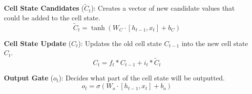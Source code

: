 \documentclass[12pt]{article}
\begin{document}
\textbf{Cell State Candidates} (\(\tilde{C}_t\)): Creates a vector of new candidate values that could be added to the cell state.
\begin{equation}
    \tilde{C}_t = \tanh(W_C \cdot [h_{t-1}, x_t] + b_C)
\end{equation}

\textbf{Cell State Update} (\(C_t\)): Updates the old cell state \(C_{t-1}\) into the new cell state \(C_t\).
\begin{equation}
    C_t = f_t \ast C_{t-1} + i_t \ast \tilde{C}_t
\end{equation}

\textbf{Output Gate} (\(o_t\)): Decides what part of the cell state will be outputted.
\begin{equation}
    o_t = \sigma(W_o \cdot [h_{t-1}, x_t] + b_o)
\end{equation}
\end{document}
